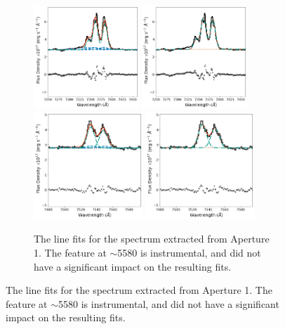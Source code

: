 \begin{figure}
\begin{subfigure}[t]{0.85\linewidth}
        \vfill
        \includegraphics[width=0.435\textwidth]{figures/muse_f13451_1232/line_fits/ap1_halpha.png}
        \hspace{1.42cm}
        \includegraphics[width=0.435\textwidth]{figures/muse_f13451_1232/line_fits/ap1_halpha_no_nuclear_model.png}
        \vfill
        \includegraphics[width=0.45\textwidth]{figures/muse_f13451_1232/line_fits/ap1_sii.png}
        \hspace{1.3cm}
        \includegraphics[width=0.45\textwidth]{figures/muse_f13451_1232/line_fits/ap1_sii_no_nuclear_model.png}
        \label{fig: muse_f13451_1232: analysis_and_results: extended_emission: ap1_line_fits}
        \caption{The line fits for the spectrum extracted from Aperture 1. The feature at $\sim$5580\;{\AA} is instrumental, and did not have a significant impact on the resulting fits. }
    \end{subfigure}
\end{figure}
